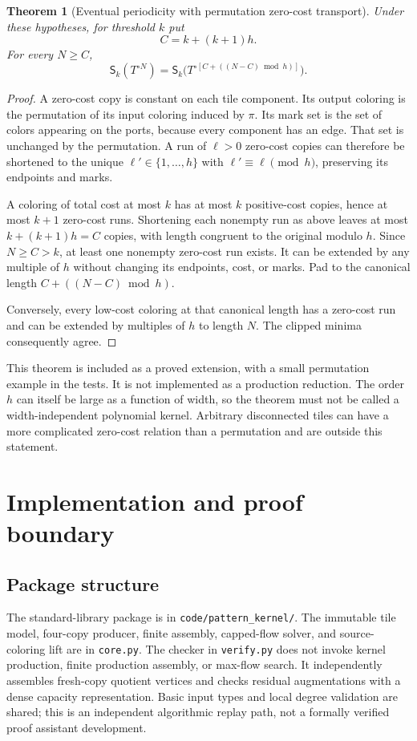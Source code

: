 \documentclass[11pt]{article}
\newtheorem{theorem}{Theorem}[section]
\theoremstyle{remark}\newtheorem{remark}[theorem]{Remark}
\newcommand{\Sig}{\mathsf S}
\DeclareRobustCommand{\code}[1]{\nolinkurl{#1}}
\begin{document}
\begin{theorem}[Eventual periodicity with permutation zero-cost transport]
\label{thm:period}
Under these hypotheses, for threshold $k$ put
\[
 C=k+(k+1)h.
\]
For every $N\ge C$,
\[
 \Sig_k(T^{\circ N})
 =\Sig_k\bigl(T^{\circ [C+((N-C)\bmod h)]}\bigr).
\]
\end{theorem}
\begin{proof}
A zero-cost copy is constant on each tile component. Its output coloring is the permutation of its input coloring induced by $\pi$. Its mark set is the set of colors appearing on the ports, because every component has an edge. That set is unchanged by the permutation. A run of $\ell>0$ zero-cost copies can therefore be shortened to the unique $\ell'\in\{1,\ldots,h\}$ with $\ell'\equiv\ell\pmod h$, preserving its endpoints and marks.

A coloring of total cost at most $k$ has at most $k$ positive-cost copies, hence at most $k+1$ zero-cost runs. Shortening each nonempty run as above leaves at most $k+(k+1)h=C$ copies, with length congruent to the original modulo $h$. Since $N\ge C>k$, at least one nonempty zero-cost run exists. It can be extended by any multiple of $h$ without changing its endpoints, cost, or marks. Pad to the canonical length $C+((N-C)\bmod h)$.

Conversely, every low-cost coloring at that canonical length has a zero-cost run and can be extended by multiples of $h$ to length $N$. The clipped minima consequently agree.
\end{proof}

This theorem is included as a proved extension, with a small permutation example in the tests. It is not implemented as a production reduction. The order $h$ can itself be large as a function of width, so the theorem must not be called a width-independent polynomial kernel. Arbitrary disconnected tiles can have a more complicated zero-cost relation than a permutation and are outside this statement.

\section{Implementation and proof boundary}
\subsection{Package structure}
The standard-library package is in \code{code/pattern_kernel/}. The immutable tile model, four-copy producer, finite assembly, capped-flow solver, and source-coloring lift are in \code{core.py}. The checker in \code{verify.py} does not invoke kernel production, finite production assembly, or max-flow search. It independently assembles fresh-copy quotient vertices and checks residual augmentations with a dense capacity representation. Basic input types and local degree validation are shared; this is an independent algorithmic replay path, not a formally verified proof assistant development.
\end{document}
